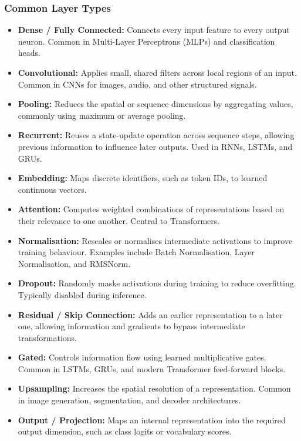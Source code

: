 \subsubsection{Common Layer Types}
\begin{itemize}
    \item \textbf{Dense / Fully Connected:} Connects every input feature to every output neuron. Common in Multi-Layer Perceptrons (MLPs) and classification heads.
    \item \textbf{Convolutional:} Applies small, shared filters across local regions of an input. Common in CNNs for images, audio, and other structured signals.
    \item \textbf{Pooling:} Reduces the spatial or sequence dimensions by aggregating values, commonly using maximum or average pooling.
    \item \textbf{Recurrent:} Reuses a state-update operation across sequence steps, allowing previous information to influence later outputs. Used in RNNs, LSTMs, and GRUs.
    \item \textbf{Embedding:} Maps discrete identifiers, such as token IDs, to learned continuous vectors.
    \item \textbf{Attention:} Computes weighted combinations of representations based on their relevance to one another. Central to Transformers.
    \item \textbf{Normalisation:} Rescales or normalises intermediate activations to improve training behaviour. Examples include Batch Normalisation, Layer Normalisation, and RMSNorm.
    \item \textbf{Dropout:} Randomly masks activations during training to reduce overfitting. Typically disabled during inference.
    \item \textbf{Residual / Skip Connection:} Adds an earlier representation to a later one, allowing information and gradients to bypass intermediate transformations.
    \item \textbf{Gated:} Controls information flow using learned multiplicative gates. Common in LSTMs, GRUs, and modern Transformer feed-forward blocks.
    \item \textbf{Upsampling:} Increases the spatial resolution of a representation. Common in image generation, segmentation, and decoder architectures.
    \item \textbf{Output / Projection:} Maps an internal representation into the required output dimension, such as class logits or vocabulary scores.
\end{itemize}


